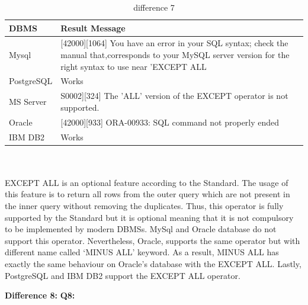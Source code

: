 \begin{table}[h]
\centering
\caption{difference 7}
\label{my-label}
\begin{tabular}{|p{2cm}|p{11.5cm}| }
\hline
\textbf{DBMS} & \textbf{Result Message}                                                                                                                                                 \\ \hline
Mysql         & {[}42000{]}{[}1064{]} You have an error in your SQL syntax; check the manual that,corresponds to your MySQL server version for the right syntax to use near 'EXCEPT ALL \\ \hline
PostgreSQL    & Works                                                                                                                                                                   \\ \hline
MS Server     & S0002{]}{[}324{]} The 'ALL' version of the EXCEPT operator is not supported.                                                                                            \\ \hline
Oracle        & {[}42000{]}{[}933{]} ORA-00933: SQL command not properly ended                                                                                                          \\ \hline
IBM DB2       & Works                                                                                                                                                                   \\ \hline
\end{tabular}
\end{table}

\hfill\\\\
EXCEPT ALL is an optional feature according to the Standard. The usage of this feature is to return all rows from the outer query which are not present in the inner query without removing the duplicates. Thus, this operator is fully supported by the Standard but it is optional meaning that it is not compulsory to be implemented by modern DBMSs. MySql and Oracle database do not support this operator. Nevertheless, Oracle, supports the same operator but with different name called ‘MINUS ALL’ keyword. As a result, MINUS ALL  has exactly the same behaviour on Oracle’s database with the EXCEPT ALL.  Lastly, PostgreSQL and IBM DB2 support the EXCEPT ALL operator. 


\hfill\newline\textbf{Difference 8:}
\hfill\newline\textbf{Q8:}

